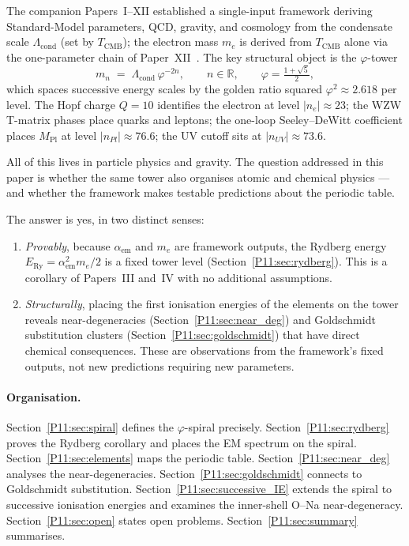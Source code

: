 \documentclass[11pt,a4paper]{article}
\theoremstyle{definition}
\theoremstyle{remark}
\newcommand{\vp}{\varphi}
\newcommand{\TCMB}{T_{\mathrm{CMB}}}
\newcommand{\Lcond}{\Lambda_{\mathrm{cond}}}
\newcommand{\MPl}{M_{\mathrm{Pl}}}
\newcommand{\ERy}{E_{\mathrm{Ry}}}
\newcommand{\aem}{\alpha_{\mathrm{em}}}
\begin{document}
The companion Papers~I--XII established a single-input framework deriving
Standard-Model parameters, QCD, gravity, and cosmology from the
condensate scale $\Lcond$ (set by $\TCMB$); the electron mass $m_e$
is derived from $\TCMB$ alone via the one-parameter chain of
Paper~XII~\cite{Paper12}.
The key structural object is the $\vp$-tower
\begin{equation}
  m_n \;=\; \Lcond\,\vp^{-2n}, \qquad n \in \mathbb{R}, \qquad
  \vp = \tfrac{1+\sqrt{5}}{2},
  \label{P11:eq:tower}
\end{equation}
which spaces successive energy scales by the golden ratio squared
$\vp^2 \approx 2.618$ per level.  The Hopf charge $Q=10$ identifies
the electron at level $|n_e| \approx 23$; the WZW T-matrix phases
place quarks and leptons; the one-loop Seeley--DeWitt coefficient
places $\MPl$ at level $|n_{Pl}| \approx 76.6$; the
UV cutoff sits at $|n_{UV}| \approx 73.6$.

All of this lives in particle physics and gravity.  The question
addressed in this paper is whether the same tower also organises
atomic and chemical physics — and whether the framework makes
testable predictions about the periodic table.

The answer is yes, in two distinct senses:
\begin{enumerate}[noitemsep]
\item \emph{Provably}, because $\aem$ and $m_e$ are framework outputs,
  the Rydberg energy $\ERy = \aem^2 m_e/2$ is a fixed tower level
  (Section~\ref{P11:sec:rydberg}).  This is a corollary of Papers~III
  and~IV with no additional assumptions.
\item \emph{Structurally}, placing the first ionisation energies
  of the elements on the tower reveals near-degeneracies
  (Section~\ref{P11:sec:near_deg}) and Goldschmidt substitution clusters
  (Section~\ref{P11:sec:goldschmidt}) that have direct chemical
  consequences.  These are observations from the framework's fixed
  outputs, not new predictions requiring new parameters.
\end{enumerate}

\paragraph{Organisation.}
Section~\ref{P11:sec:spiral} defines the $\vp$-spiral precisely.
Section~\ref{P11:sec:rydberg} proves the Rydberg corollary and places
the EM spectrum on the spiral.
Section~\ref{P11:sec:elements} maps the periodic table.
Section~\ref{P11:sec:near_deg} analyses the near-degeneracies.
Section~\ref{P11:sec:goldschmidt} connects to Goldschmidt substitution.
Section~\ref{P11:sec:successive_IE} extends the spiral to successive
ionisation energies and examines the inner-shell O--Na near-degeneracy.
Section~\ref{P11:sec:open} states open problems.
Section~\ref{P11:sec:summary} summarises.
\end{document}
